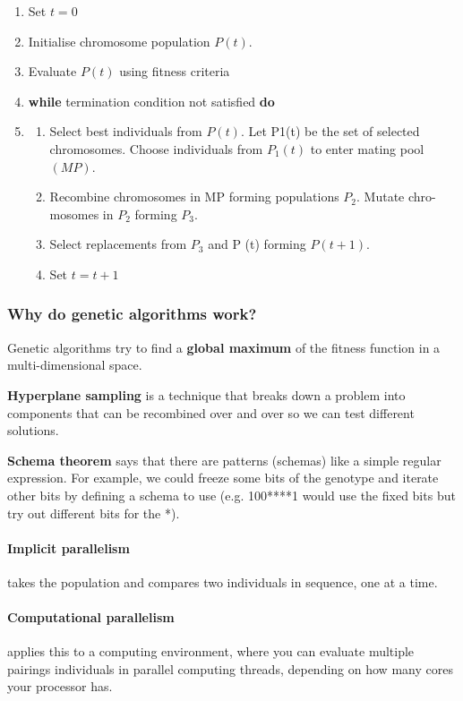 \begin{enumerate}
    \item Set $t = 0$
    \item Initialise chromosome population $P(t)$.
    \item Evaluate $P(t)$ using fitness criteria
    \item \textbf{while} termination condition not satisfied \textbf{do} 
    \item \begin{enumerate}
        \item Select best individuals from $P(t)$. Let P1(t) be the set of selected chromosomes. Choose individuals from $P_{1}(t)$ to enter mating pool $(MP)$.
        \item Recombine chromosomes in MP forming populations $P_2$. Mutate chro- mosomes in $P_2$ forming $P_3$.
        \item Select replacements from $P_3$ and P (t) forming $P (t + 1)$.
        \item Set $t=t+1$
    \end{enumerate}
\end{enumerate}

\subsubsection{Why do genetic algorithms work?}

Genetic algorithms try to find a \textbf{global maximum} of the fitness function in a multi-dimensional space.

\textbf{Hyperplane sampling} is a technique that breaks down a problem into components that can be recombined over and over so we can test different solutions.

\textbf{Schema theorem} says that there are patterns (schemas) like a simple regular expression. For example, we could freeze some bits of the genotype and iterate other bits by defining a schema to use (e.g. 100****1 would use the fixed bits but try out different bits for the *).

\paragraph{Implicit parallelism} takes the population and compares two individuals in sequence, one at a time.

\paragraph{Computational parallelism} applies this to a computing environment, where you can evaluate multiple pairings individuals in parallel computing threads, depending on how many cores your processor has.

